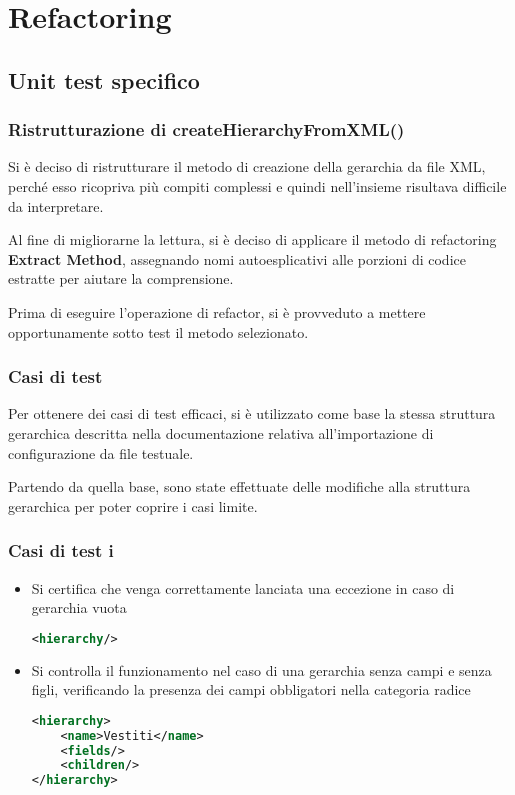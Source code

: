 
\section{Refactoring}

\subsection{Unit test specifico}
\begin{frame}
    \frametitle{Ristrutturazione di createHierarchyFromXML()}
    Si è deciso di ristrutturare il metodo di creazione della gerarchia da file XML, perché esso ricopriva più compiti complessi e quindi nell'insieme risultava difficile da interpretare.\pause

    Al fine di migliorarne la lettura, si è deciso di applicare il metodo di refactoring \textbf{Extract Method}, assegnando nomi autoesplicativi alle porzioni di codice estratte per aiutare la comprensione.\pause

    Prima di eseguire l'operazione di refactor, si è provveduto a mettere opportunamente sotto test il metodo selezionato.
\end{frame}

\begin{frame}[allowframebreaks]
    \frametitle{Casi di test}
    Per ottenere dei casi di test efficaci, si è utilizzato come base la stessa struttura gerarchica descritta nella documentazione relativa all'importazione di configurazione da file testuale.\pause

    Partendo da quella base, sono state effettuate delle modifiche alla struttura gerarchica per poter coprire i casi limite.
\end{frame}

\begin{frame}[fragile]
    \frametitle{Casi di test i}
    \lstset{style=java}
    \begin{itemize}
        \item <1-> Si certifica che venga correttamente lanciata una eccezione in caso di gerarchia vuota
\begin{lstlisting}[language=xml]
<hierarchy/>
\end{lstlisting}
        \item <2-> Si controlla il funzionamento nel caso di una gerarchia senza campi e senza figli, verificando la presenza dei campi obbligatori nella categoria radice
\begin{lstlisting}[language=xml]
<hierarchy>
    <name>Vestiti</name>
    <fields/>
    <children/>
</hierarchy>
\end{lstlisting}
    \end{itemize}
\end{frame}
\note{
    
}

